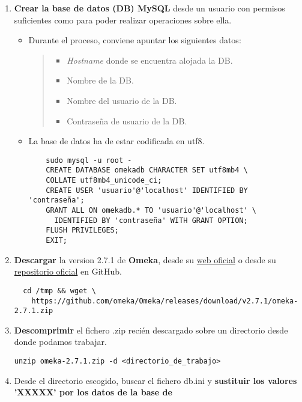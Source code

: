 \begin{enumerate}
\def\labelenumi{\arabic{enumi}.}
\tightlist
\item
  \textbf{Crear la base de datos (DB) MySQL} desde un usuario con
  permisos suficientes como para poder realizar operaciones sobre ella.
  \begin{itemize}
  \item
    Durante el proceso, conviene apuntar los siguientes datos:
    \begin{quote}
    \begin{itemize}
    \tightlist
    \item
      \emph{Hostname} donde se encuentra alojada la DB.
    \item
      Nombre de la DB.
    \item
      Nombre del usuario de la DB.
    \item
      Contraseña de usuario de la DB.
    \end{itemize}
    \end{quote}
  \item
    La base de datos ha de estar codificada en {utf8}.
    \begin{verbatim}
 	sudo mysql -u root -
   	CREATE DATABASE omekadb CHARACTER SET utf8mb4 \
   	COLLATE utf8mb4_unicode_ci;
   	CREATE USER 'usuario'@'localhost' IDENTIFIED BY 'contraseña';
   	GRANT ALL ON omekadb.* TO 'usuario'@'localhost' \
      IDENTIFIED BY 'contraseña' WITH GRANT OPTION;
   	FLUSH PRIVILEGES;
   	EXIT;
   	\end{verbatim}
  \end{itemize}
  \item
  \textbf{Descargar} la version 2.7.1 de \textbf{Omeka}, desde su \href{https://omeka.org/classic/download/}{web oficial} o desde su \href{http://github.com/omeka/Omeka}{repositorio oficial} en
  GitHub.
  \begin{verbatim}
  cd /tmp && wget \
    https://github.com/omeka/Omeka/releases/download/v2.7.1/omeka-2.7.1.zip
  \end{verbatim}
\item
  \textbf{Descomprimir} el fichero {.zip} recién descargado sobre un
  directorio desde donde podamos trabajar.
\begin{verbatim}
unzip omeka-2.7.1.zip -d <directorio_de_trabajo>
\end{verbatim}
\item
  Desde el directorio escogido, buscar el fichero {db.ini} y
  \textbf{sustituir los valores 'XXXXX' por los datos de la base de
}
\end{enumerate}
